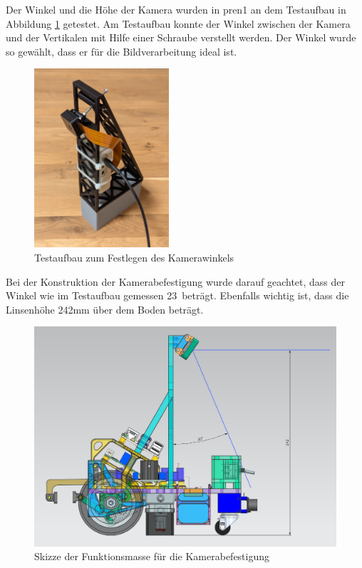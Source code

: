Der Winkel und die Höhe der Kamera wurden in \acrshort{pren1} an dem Testaufbau in Abbildung \ref{fig:Testaufbau zum Festlegen des Kamerawinkels} getestet. Am Testaufbau konnte der Winkel zwischen der Kamera und der Vertikalen mit Hilfe einer Schraube verstellt werden. Der Winkel wurde so gewählt, dass er für die Bildverarbeitung ideal ist. 

\begin{figure}[H]
\centering
\includegraphics[width=5cm]{assets/MT/camer_tower_2.png}
\caption{Testaufbau zum Festlegen des Kamerawinkels}
\label{fig:Testaufbau zum Festlegen des Kamerawinkels}
\end{figure}


Bei der Konstruktion der Kamerabefestigung wurde darauf geachtet, dass der Winkel wie im Testaufbau gemessen 23\textdegree\ beträgt. Ebenfalls wichtig ist, dass die Linsenhöhe 242mm über dem Boden beträgt. 

 \begin{figure}[H]
\centering
\includegraphics[width= \textwidth ]{assets/MT/Sichtfeld_Roboter.png}
\caption{Skizze der Funktionsmasse für die Kamerabefestigung}
\label{fig:Skizze der Funktionsmasse für die Kamerabefestigung}
\end{figure}

